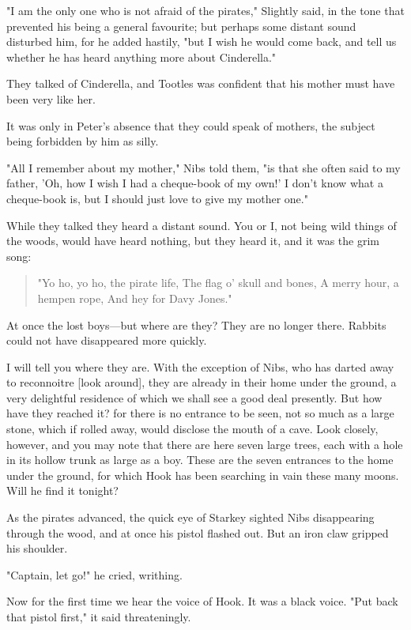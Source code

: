 "I am the only one who is not afraid of the pirates," Slightly said, in
the tone that prevented his being a general favourite; but perhaps some
distant sound disturbed him, for he added hastily, "but I wish he would
come back, and tell us whether he has heard anything more about
Cinderella."


They talked of Cinderella, and Tootles was confident that his mother must
have been very like her.


It was only in Peter's absence that they could speak of mothers, the
subject being forbidden by him as silly.


"All I remember about my mother," Nibs told them, "is that she often said
to my father, 'Oh, how I wish I had a cheque-book of my own!' I don't know
what a cheque-book is, but I should just love to give my mother one."


While they talked they heard a distant sound. You or I, not being wild
things of the woods, would have heard nothing, but they heard it, and it
was the grim song:

\begin{verse}
     "Yo ho, yo ho, the pirate life,
     The flag o' skull and bones,
     A merry hour, a hempen rope,
     And hey for Davy Jones."
\end{verse}

At once the lost boys—but where are they? They are no longer there.
Rabbits could not have disappeared more quickly.


I will tell you where they are. With the exception of Nibs, who has darted
away to reconnoitre [look around], they are already in their home under
the ground, a very delightful residence of which we shall see a good deal
presently. But how have they reached it? for there is no entrance to be
seen, not so much as a large stone, which if rolled away, would disclose
the mouth of a cave. Look closely, however, and you may note that there
are here seven large trees, each with a hole in its hollow trunk as large
as a boy. These are the seven entrances to the home under the ground, for
which Hook has been searching in vain these many moons. Will he find it
tonight?


As the pirates advanced, the quick eye of Starkey sighted Nibs
disappearing through the wood, and at once his pistol flashed out. But an
iron claw gripped his shoulder.


"Captain, let go!" he cried, writhing.


Now for the first time we hear the voice of Hook. It was a black voice.
"Put back that pistol first," it said threateningly.


